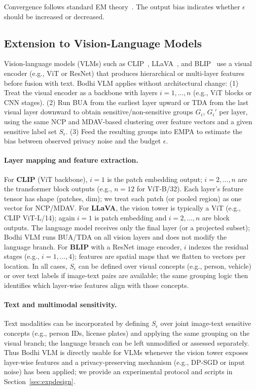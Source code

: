 \documentclass[journal,transmag]{IEEEtran}
\begin{document}
Convergence follows standard EM theory~\cite{em-converge}. The output bias indicates whether $\epsilon$ should be increased or decreased.

\subsection{Extension to Vision-Language Models}
\label{subsec:vlm}

Vision-language models (VLMs) such as CLIP~\cite{radford2021learning}, LLaVA~\cite{liu2023llava}, and BLIP~\cite{li2022blip} use a visual encoder (e.g., ViT or ResNet) that produces hierarchical or multi-layer features before fusion with text. Bodhi VLM applies without architectural change: (1) Treat the visual encoder as a backbone with layers $i=1,\ldots,n$ (e.g., ViT blocks or CNN stages). (2) Run BUA from the earliest layer upward or TDA from the last visual layer downward to obtain sensitive/non-sensitive groups $G_i$, $G_i'$ per layer, using the same NCP and MDAV-based clustering over feature vectors and a given sensitive label set $S_\epsilon$. (3) Feed the resulting groups into EMPA to estimate the bias between observed privacy noise and the budget $\epsilon$.

\paragraph{Layer mapping and feature extraction.}
For \textbf{CLIP} (ViT backbone), $i=1$ is the patch embedding output; $i=2,\ldots,n$ are the transformer block outputs (e.g., $n=12$ for ViT-B/32). Each layer's feature tensor has shape (patches, dim); we treat each patch (or pooled region) as one vector for NCP/MDAV. For \textbf{LLaVA}, the vision tower is typically a ViT (e.g., CLIP ViT-L/14); again $i=1$ is patch embedding and $i=2,\ldots,n$ are block outputs. The language model receives only the final layer (or a projected subset); Bodhi VLM runs BUA/TDA on all vision layers and does not modify the language branch. For \textbf{BLIP} with a ResNet image encoder, $i$ indexes the residual stages (e.g., $i=1,\ldots,4$); features are spatial maps that we flatten to vectors per location. In all cases, $S_\epsilon$ can be defined over visual concepts (e.g., person, vehicle) or over text labels if image-text pairs are available; the same grouping logic then identifies which layer-wise features align with those concepts.

\paragraph{Text and multimodal sensitivity.}
Text modalities can be incorporated by defining $S_\epsilon$ over joint image-text sensitive concepts (e.g., person IDs, license plates) and applying the same grouping on the visual branch; the language branch can be left unmodified or assessed separately. Thus Bodhi VLM is directly usable for VLMs whenever the vision tower exposes layer-wise features and a privacy-preserving mechanism (e.g., DP-SGD or input noise) has been applied; we provide an experimental protocol and scripts in Section~\ref{sec:expdesign}.
\end{document}
